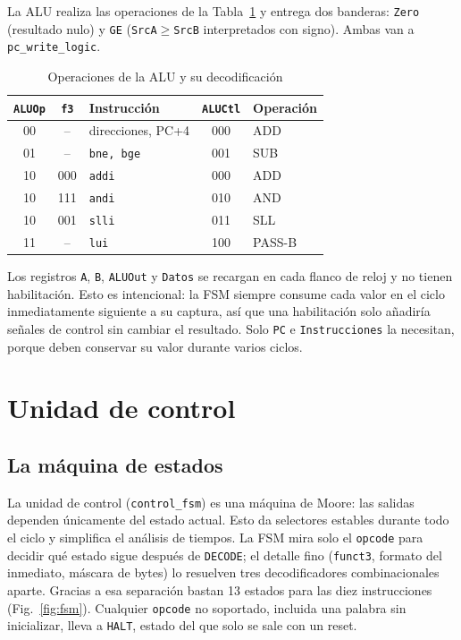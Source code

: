 \documentclass[conference]{IEEEtran}
\newcommand{\cod}[1]{\texttt{\small #1}}
\begin{document}
La ALU realiza las operaciones de la Tabla~\ref{tab:alu} y entrega dos banderas: \cod{Zero} (resultado nulo) y \cod{GE} (\cod{SrcA}$\ge$\cod{SrcB} interpretados con signo). Ambas van a \cod{pc\_write\_logic}.

\begin{table}[t]
\caption{Operaciones de la ALU y su decodificación}\label{tab:alu}
\centering\footnotesize
\setlength{\tabcolsep}{3pt}\begin{tabular}{@{}ccp{2.6cm}cl@{}}\toprule
\cod{ALUOp} & \cod{f3} & Instrucción & \cod{ALUCtl} & Operación\\\midrule
00 & -- & direcciones, PC+4 & 000 & ADD\\
01 & -- & \cod{bne, bge} & 001 & SUB\\
10 & 000 & \cod{addi} & 000 & ADD\\
10 & 111 & \cod{andi} & 010 & AND\\
10 & 001 & \cod{slli} & 011 & SLL\\
11 & -- & \cod{lui} & 100 & PASS-B\\\bottomrule
\end{tabular}
\end{table}

Los registros \cod{A}, \cod{B}, \cod{ALUOut} y \cod{Datos} se recargan en cada flanco de reloj y no tienen habilitación. Esto es intencional: la FSM siempre consume cada valor en el ciclo inmediatamente siguiente a su captura, así que una habilitación solo añadiría señales de control sin cambiar el resultado. Solo \cod{PC} e \cod{Instrucciones} la necesitan, porque deben conservar su valor durante varios ciclos.

\section{Unidad de control}
\subsection{La máquina de estados}
La unidad de control (\cod{control\_fsm}) es una máquina de Moore: las salidas dependen únicamente del estado actual. Esto da selectores estables durante todo el ciclo y simplifica el análisis de tiempos. La FSM mira solo el \cod{opcode} para decidir qué estado sigue después de \cod{DECODE}; el detalle fino (\cod{funct3}, formato del inmediato, máscara de bytes) lo resuelven tres decodificadores combinacionales aparte. Gracias a esa separación bastan 13 estados para las diez instrucciones (Fig.~\ref{fig:fsm}). Cualquier \cod{opcode} no soportado, incluida una palabra sin inicializar, lleva a \cod{HALT}, estado del que solo se sale con un reset.
\end{document}
